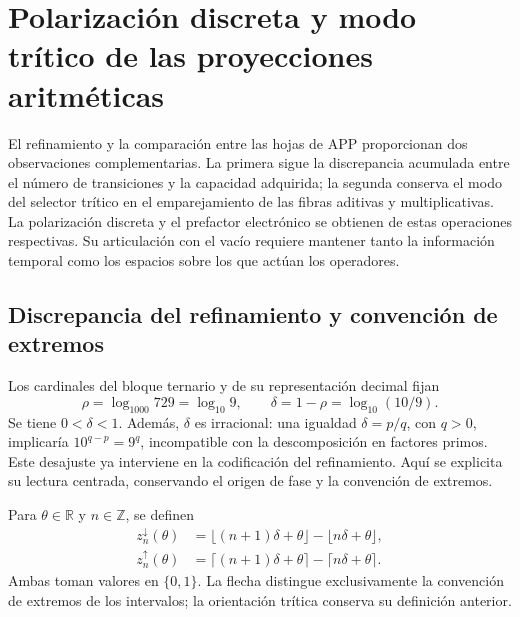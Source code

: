 \section{Polarización discreta y modo trítico de las proyecciones aritméticas}
\label{iii:sec:vacancias-prefactor}

El refinamiento y la comparación entre las hojas de APP proporcionan dos
observaciones complementarias. La primera sigue la discrepancia acumulada
entre el número de transiciones y la capacidad adquirida; la segunda conserva
el modo del selector trítico en el emparejamiento de las fibras aditivas y
multiplicativas. La polarización discreta y el prefactor electrónico se
obtienen de estas operaciones respectivas. Su articulación con el vacío
requiere mantener tanto la información temporal como los espacios sobre los
que actúan los operadores.

\subsection{Discrepancia del refinamiento y convención de extremos}

Los cardinales del bloque ternario y de su representación decimal fijan
\[
 \rho=\log_{1000}729=\log_{10}9,\qquad
 \delta=1-\rho=\log_{10}(10/9).
\]
Se tiene $0<\delta<1$. Además, $\delta$ es irracional: una igualdad
$\delta=p/q$, con $q>0$, implicaría $10^{q-p}=9^q$, incompatible con
la descomposición en factores primos. Este desajuste ya interviene en la
codificación del refinamiento. Aquí se explicita su lectura centrada,
conservando el origen de fase y la convención de extremos.

\begin{definition}
Para $\theta\in\mathbb R$ y $n\in\mathbb Z$, se definen
\begin{align}
 z_n^{\downarrow}(\theta)
 &=\lfloor(n+1)\delta+\theta\rfloor-\lfloor n\delta+\theta\rfloor,
 \label{iii:vp:lower}\\
 z_n^{\uparrow}(\theta)
 &=\lceil(n+1)\delta+\theta\rceil-\lceil n\delta+\theta\rceil.
 \label{iii:vp:upper}
\end{align}
Ambas toman valores en $\{0,1\}$. La flecha distingue exclusivamente la
convención de extremos de los intervalos; la orientación trítica conserva
su definición anterior.
\end{definition}

